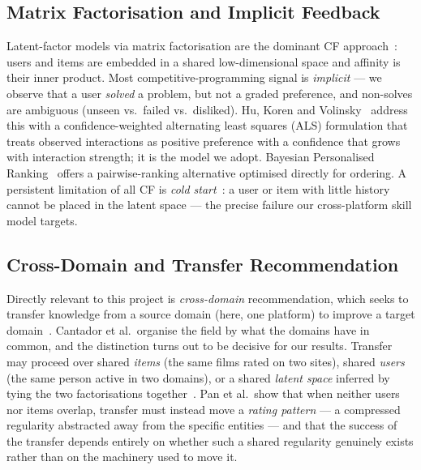 \documentclass[12pt,a4paper]{article}
\begin{document}
\subsection{Matrix Factorisation and Implicit Feedback}
Latent-factor models via matrix factorisation are the dominant CF
approach~\cite{koren2009}: users and items are embedded in a shared low-dimensional
space and affinity is their inner product. Most competitive-programming signal is
\emph{implicit} --- we observe that a user \emph{solved} a problem, but not a graded
preference, and non-solves are ambiguous (unseen vs.\ failed vs.\ disliked). Hu, Koren
and Volinsky~\cite{hu2008} address this with a confidence-weighted alternating least
squares (ALS) formulation that treats observed interactions as positive preference with
a confidence that grows with interaction strength; it is the model we adopt.
Bayesian Personalised Ranking~\cite{rendle2009} offers a pairwise-ranking alternative
optimised directly for ordering. A persistent limitation of all CF is
\emph{cold start}~\cite{schein2002}: a user or item with little history cannot be
placed in the latent space --- the precise failure our cross-platform skill model
targets.

\subsection{Cross-Domain and Transfer Recommendation}
Directly relevant to this project is \emph{cross-domain} recommendation, which seeks to
transfer knowledge from a source domain (here, one platform) to improve a target
domain~\cite{cantador2015}. Cantador et al.\ organise the field by what the domains have
in common, and the distinction turns out to be decisive for our results. Transfer may
proceed over shared \emph{items} (the same films rated on two sites), shared
\emph{users} (the same person active in two domains), or a shared \emph{latent space}
inferred by tying the two factorisations together~\cite{pan2010}. Pan et al.\ show that
when neither users nor items overlap, transfer must instead move a \emph{rating pattern}
--- a compressed regularity abstracted away from the specific entities --- and that the
success of the transfer depends entirely on whether such a shared regularity genuinely
exists rather than on the machinery used to move it.
\end{document}
